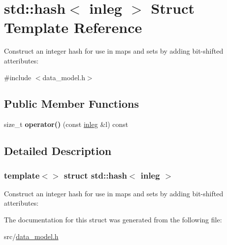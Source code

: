 \hypertarget{structstd_1_1hash_3_01inleg_01_4}{}\section{std\+:\+:hash$<$ inleg $>$ Struct Template Reference}
\label{structstd_1_1hash_3_01inleg_01_4}


Construct an integer hash for use in maps and sets by adding bit-\/shifted atteributes\+:  




{\ttfamily \#include $<$data\+\_\+model.\+h$>$}

\subsection*{Public Member Functions}
\begin{DoxyCompactItemize}
\item 
\mbox{\label{structstd_1_1hash_3_01inleg_01_4_af112d7e69e12213382bac92e389e1809}} 
size\+\_\+t {\bfseries operator()} (const \hyperlink{structtricl_1_1inleg}{inleg} \&l) const
\end{DoxyCompactItemize}


\subsection{Detailed Description}
\subsubsection*{template$<$$>$\newline
struct std\+::hash$<$ inleg $>$}

Construct an integer hash for use in maps and sets by adding bit-\/shifted atteributes\+: 

The documentation for this struct was generated from the following file\+:\begin{DoxyCompactItemize}
\item 
src/\hyperlink{data__model_8h}{data\+\_\+model.\+h}\end{DoxyCompactItemize}

